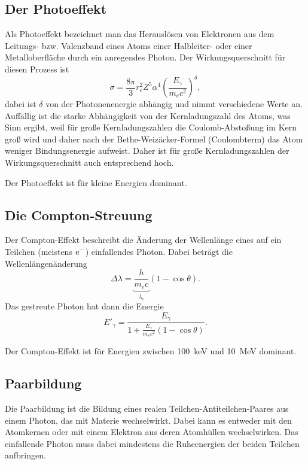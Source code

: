 \subsection{Der Photoeffekt}
Als Photoeffekt bezeichnet man das Herauslösen von Elektronen aus dem Leitungs- bzw. Valenzband eines Atoms einer Halbleiter- oder einer Metalloberfläche durch ein anregendes Photon.
Der Wirkungsquerschnitt für diesen Prozess ist
\begin{equation*}
	\sigma = \frac{8\pi}{3}r_e^2Z^5\alpha^4\left(\frac{E_\gamma}{m_ec^2}\right)^\delta,
\end{equation*}
dabei ist $\delta$ von der Photonenenergie abhängig und nimmt verschiedene Werte an.
Auffällig ist die starke Abhängigkeit von der Kernladungszahl des Atoms, was Sinn ergibt, weil für große Kernladungszahlen die Coulomb-Abstoßung im Kern groß wird und daher nach der Bethe-Weizäcker-Formel (Coulombterm) das Atom weniger Bindungsenergie aufweist.
Daher ist für große Kernladungszahlen der Wirkungsquerschnitt auch entsprechend hoch.

Der Photoeffekt ist für kleine Energien dominant.

\subsection{Die Compton-Streuung}
Der Compton-Effekt beschreibt die Änderung der Wellenlänge eines auf ein Teilchen (meistens $\text{e}^-$) einfallendes Photon.
Dabei beträgt die Wellenlängenänderung
\begin{equation*}
	\Delta\lambda = \underbrace{\frac{h}{m_ec}}_{\lambda_\text{c}}(1-\cos\theta).
\end{equation*}
Das gestreute Photon hat dann die Energie
\begin{equation*}
	E'_\gamma = \frac{E_\gamma}{1 + \frac{E_\gamma}{m_ec^2}(1-\cos\theta)}.
\end{equation*}

Der Compton-Effekt ist für Energien zwischen \SI{100}{\keV} und \SI{10}{\MeV} dominant.

\subsection{Paarbildung}
Die Paarbildung ist die Bildung eines realen Teilchen-Antiteilchen-Paares aus einem Photon, das mit Materie wechselwirkt.
Dabei kann es entweder mit den Atomkernen oder mit einem Elektron aus deren Atomhüllen wechselwirken.
Das einfallende Photon muss dabei mindestens die Ruheenergien der beiden Teilchen aufbringen.

